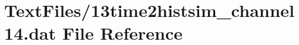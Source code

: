 \hypertarget{13time2histsim__channel14_8dat}{}\section{Text\+Files/13time2histsim\+\_\+channel14.dat File Reference}
\label{13time2histsim__channel14_8dat}
